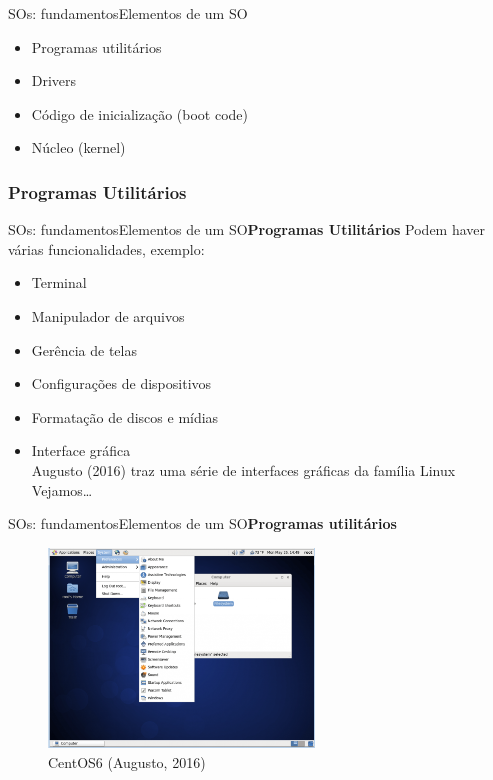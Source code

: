 \documentclass{beamer}
\begin{document}
      \begin{frame}{SOs: fundamentos}{Elementos de um SO}
        \begin{itemize}
        \item Programas utilitários
        \item Drivers
        \item Código de inicialização (boot code)
        \item Núcleo (kernel)
        \end{itemize}
      \end{frame}

      \subsubsection{Programas Utilitários}
      
        \begin{frame}{SOs: fundamentos}{Elementos de um SO}{\bfseries{Programas Utilitários}}
          Podem haver várias funcionalidades, exemplo:
          \begin{itemize}
            \item Terminal
            \item Manipulador de arquivos 
            \item Gerência de telas 
            \item Configurações de dispositivos
            \item Formatação de discos e mídias 
            \item Interface gráfica \\Augusto (2016) traz uma série de interfaces gráficas da família Linux \\Vejamos\dots
          \end{itemize}
        \end{frame}

        \begin{frame}{SOs: fundamentos}{Elementos de um SO}{\bfseries{Programas utilitários}}
          \begin{figure}[!htb]
            \centering
            \includegraphics[width=200pt, keepaspectratio=true]{interfacesLinux/gnome_centos_6_gui_namhuy-1024x771.png}
            \caption{CentOS6 (Augusto, 2016)}
            \label{gnome_centos_6_gui_namhuy}
          \end{figure}
        \end{frame}
\end{document}
